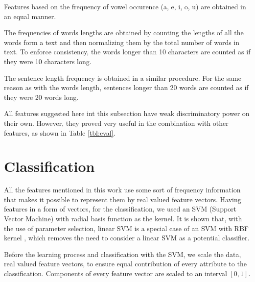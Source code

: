 \documentclass{llncs}
\begin{document}
Features based on the frequency of vowel occurence (a, e, i, o, u) are
obtained in an equal manner.

The frequencies of words lengths are obtained by counting the lengths of all
the words form a text and then normalizing them by the total number of words in
text. To enforce consistency, the words longer than 10 characters are counted as
if they were 10 characters long.

The sentence length frequency is obtained in a similar procedure.
For the same reason as with the words length, sentences longer than 20 words are
counted as if they were 20 words long.

All features suggested here int this subsection have weak discriminatory power
on their own. However, they proved very useful in the combination with other features, as
shown in Table \ref{tbl:eval}.

\section{Classification}
All the features mentioned in this work use some sort of frequency information
that makes it possible to represent them by real valued feature vectors. Having
features in a form of vectors, for the classification, we used an SVM (Support
Vector Machine) with radial basis function as the kernel. It is shown that, with
the use of parameter selection, linear SVM is a special case of an SVM with RBF
kernel \cite{keerthi2003asymptotic}, which removes the need to consider a linear
SVM as a potential classifier.

Before the learning process and classification with the SVM, we scale the data,
real valued feature vectors, to ensure equal contribution of every attribute to
the classification. Components of every feature vector are scaled to an interval
$[0, 1]$.
\end{document}
